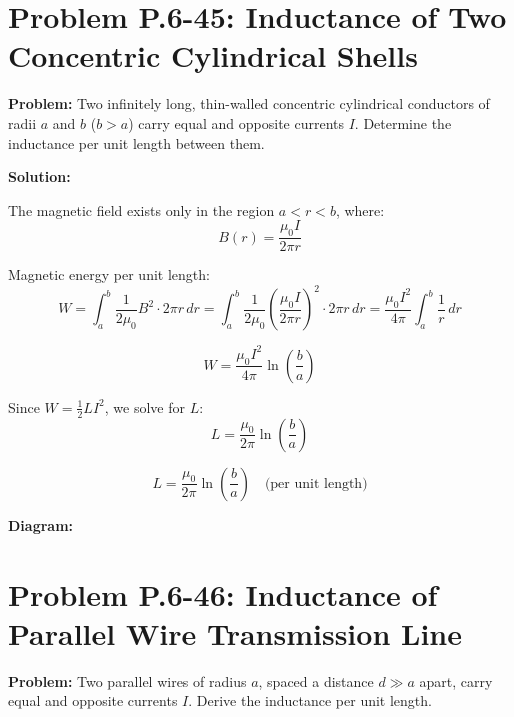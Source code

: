 \documentclass[12pt]{article}
\begin{document}
\section*{Problem P.6-45: Inductance of Two Concentric Cylindrical Shells}

\textbf{Problem:}  
Two infinitely long, thin-walled concentric cylindrical conductors of radii \( a \) and \( b \) (\( b > a \)) carry equal and opposite currents \( I \). Determine the inductance per unit length between them.

\textbf{Solution:}

The magnetic field exists only in the region \( a < r < b \), where:
\[
B(r) = \frac{\mu_0 I}{2\pi r}
\]

Magnetic energy per unit length:
\[
W = \int_a^b \frac{1}{2\mu_0} B^2 \cdot 2\pi r \, dr
= \int_a^b \frac{1}{2\mu_0} \left( \frac{\mu_0 I}{2\pi r} \right)^2 \cdot 2\pi r \, dr
= \frac{\mu_0 I^2}{4\pi} \int_a^b \frac{1}{r} \, dr
\]

\[
W = \frac{\mu_0 I^2}{4\pi} \ln\left( \frac{b}{a} \right)
\]

Since \( W = \frac{1}{2} L I^2 \), we solve for \( L \):
\[
L = \frac{\mu_0}{2\pi} \ln\left( \frac{b}{a} \right)
\]

\begin{tcolorbox}
\[
\boxed{L = \frac{\mu_0}{2\pi} \ln\left( \frac{b}{a} \right)} \quad \text{(per unit length)}
\]
\end{tcolorbox}

\textbf{Diagram:}
\begin{center}
\end{center}



\section*{Problem P.6-46: Inductance of Parallel Wire Transmission Line}

\textbf{Problem:}  
Two parallel wires of radius \( a \), spaced a distance \( d \gg a \) apart, carry equal and opposite currents \( I \). Derive the inductance per unit length.
\end{document}
